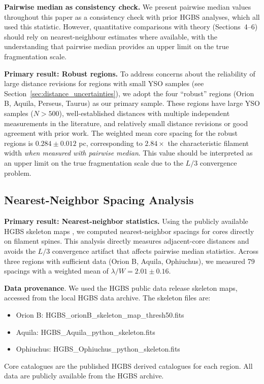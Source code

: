 \documentclass[twocolumn,usenatbib]{mnras}
\begin{document}
\textbf{Pairwise median as consistency check.}
We present pairwise median values throughout this paper as a consistency check with prior HGBS analyses, which all used this statistic. However, quantitative comparisons with theory (Sections~4--6) should rely on nearest-neighbour estimates where available, with the understanding that pairwise median provides an upper limit on the true fragmentation scale.

\textbf{Primary result: Robust regions.}
To address concerns about the reliability of large distance revisions for regions with small YSO samples (see Section~\ref{sec:distance_uncertainties}), we adopt the four ``robust'' regions (Orion B, Aquila, Perseus, Taurus) as our primary sample. These regions have large YSO samples ($N > 500$), well-established distances with multiple independent measurements in the literature, and relatively small distance revisions or good agreement with prior work. The weighted mean core spacing for the robust regions is $0.284 \pm 0.012$ pc, corresponding to $2.84\times$ the characteristic filament width \textit{when measured with pairwise median}. This value should be interpreted as an upper limit on the true fragmentation scale due to the $L/3$ convergence problem.

\subsection{Nearest-Neighbor Spacing Analysis}
\label{sec:nn_analysis}

\textbf{Primary result: Nearest-neighbor statistics.}
Using the publicly available HGBS skeleton maps \citep{Andre2010}, we computed nearest-neighbor spacings for cores directly on filament spines. This analysis directly measures adjacent-core distances and avoids the $L/3$ convergence artifact that affects pairwise median statistics. Across three regions with sufficient data (Orion B, Aquila, Ophiuchus), we measured 79 spacings with a weighted mean of $\lambda/W = 2.01 \pm 0.16$.

\noindent\textbf{Data provenance}. We used the HGBS public data release skeleton maps, accessed from the local HGBS data archive. The skeleton files are:
\begin{itemize}
\item Orion B: HGBS\_orionB\_skeleton\_map\_thresh50.fits
\item Aquila: HGBS\_Aquila\_python\_skeleton.fits
\item Ophiuchus: HGBS\_Ophiuchus\_python\_skeleton.fits
\end{itemize}
Core catalogues are the published HGBS derived catalogues for each region. All data are publicly available from the HGBS archive.
\end{document}
